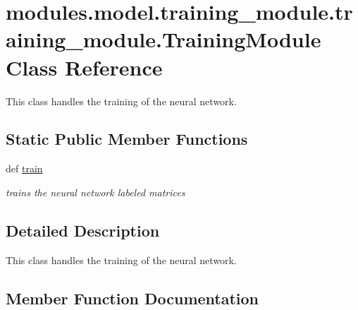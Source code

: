 \hypertarget{classmodules_1_1model_1_1training__module_1_1training__module_1_1_training_module}{}\section{modules.\+model.\+training\+\_\+module.\+training\+\_\+module.\+Training\+Module Class Reference}
\label{classmodules_1_1model_1_1training__module_1_1training__module_1_1_training_module}


This class handles the training of the neural network.  


\subsection*{Static Public Member Functions}
\begin{DoxyCompactItemize}
\item 
def \mbox{\hyperlink{classmodules_1_1model_1_1training__module_1_1training__module_1_1_training_module_a0e906a21edf9cedca9a8d21743fe937b}{train}}
\begin{DoxyCompactList}\small\item\em trains the neural network labeled matrices \end{DoxyCompactList}\end{DoxyCompactItemize}


\subsection{Detailed Description}
This class handles the training of the neural network. 

\subsection{Member Function Documentation}
\mbox{\label{classmodules_1_1model_1_1training__module_1_1training__module_1_1_training_module_a0e906a21edf9cedca9a8d21743fe937b}} 
